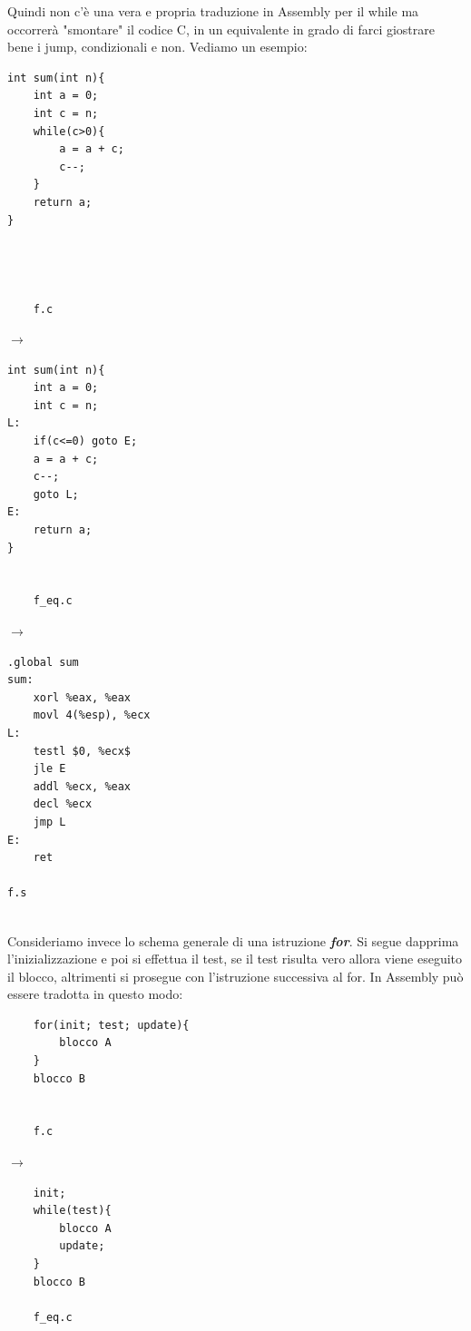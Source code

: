 \noindent Quindi non c'è una vera e propria traduzione in Assembly per il while ma occorrerà "smontare" il codice C, in un equivalente in grado di farci giostrare bene i jump, condizionali e non. Vediamo un esempio:\\
\begin{minipage}{0.2\textwidth}
    \begin{verbatim}
int sum(int n){
    int a = 0;
    int c = n;
    while(c>0){
        a = a + c;
        c--;
    }
    return a;
}



    
    f.c
    \end{verbatim}
\end{minipage}
\hfill
$\longrightarrow$
\hfill
\begin{minipage}{0.2\textwidth}
    \begin{verbatim}
int sum(int n){
    int a = 0;
    int c = n;
L:
    if(c<=0) goto E;
    a = a + c;
    c--;
    goto L;
E:
    return a;
}


    f_eq.c
    \end{verbatim}
\end{minipage}
\hfill
$\longrightarrow$
\hfill
\begin{minipage}{0.2\textwidth}
    \begin{verbatim}
.global sum
sum:
    xorl %eax, %eax
    movl 4(%esp), %ecx
L:
    testl $0, %ecx$
    jle E
    addl %ecx, %eax
    decl %ecx
    jmp L
E:
    ret

f.s
    \end{verbatim}
\end{minipage}\medskip \\
\noindent Consideriamo invece lo schema generale di una istruzione \textbf{\textit{for}}. Si segue dapprima l'inizializzazione e poi si effettua il test, se il test risulta vero allora viene eseguito il blocco, altrimenti si prosegue con l'istruzione successiva al for. In Assembly può essere tradotta in questo modo:\medskip\\
\begin{minipage}{0.4\textwidth}
    \begin{verbatim}
    for(init; test; update){
        blocco A
    }
    blocco B

    
    f.c
    \end{verbatim}
\end{minipage}
\hfill
$\longrightarrow$
\hfill
\begin{minipage}{0.4\textwidth}
    \begin{verbatim}
    init;
    while(test){
        blocco A
        update;
    }
    blocco B

    f_eq.c
    \end{verbatim}
\end{minipage} \medskip \\
